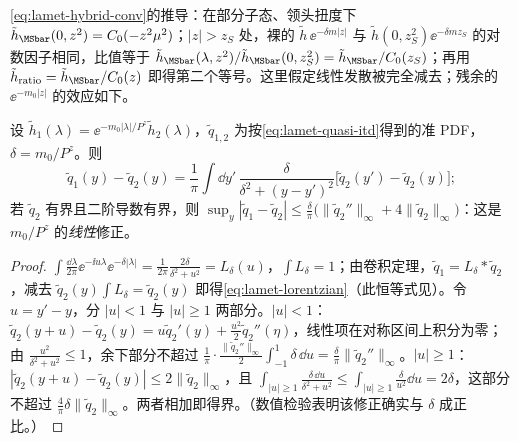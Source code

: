 \cref{eq:lamet-hybrid-conv}的推导：在部分子态、领头扭度下 $\tilde h_{\MSbar}(0,z^2)=C_0(-z^2\mu^2)$；$|z|>z_S$ 处，裸的 $\tilde h\,\ee^{-\delta m|z|}$ 与 $\tilde h(0,z_S^2)\ee^{-\delta mz_S}$ 的对数因子相同，比值等于 $\tilde h_{\MSbar}(\lambda,z^2)/\tilde h_{\MSbar}(0,z_S^2)=\tilde h_{\MSbar}/C_0(z_S)$；再用 $\tilde h_{\rm ratio}=\tilde h_{\MSbar}/C_0(z)$ 即得第二个等号。这里假定线性发散被完全减去；残余的 $\ee^{-m_0|z|}$ 的效应如下。

\begin{lemma}\label{lem:lamet-lorentzian}
设 $\tilde h_1(\lambda)=\ee^{-m_0|\lambda|/P^z}\tilde h_2(\lambda)$，$\tilde q_{1,2}$ 为按\cref{eq:lamet-quasi-itd}得到的准 PDF，$\delta=m_0/P^z$。则
\begin{equation}\label{eq:lamet-lorentzian}
\tilde q_1(y)-\tilde q_2(y)=\frac1\pi\int\dd y'\,\frac{\delta}{\delta^2+(y-y')^2}\big[\tilde q_2(y')-\tilde q_2(y)\big];
\end{equation}
若 $\tilde q_2$ 有界且二阶导数有界，则 $\sup_y|\tilde q_1-\tilde q_2|\le\frac\delta\pi\big(\|\tilde q_2''\|_\infty+4\|\tilde q_2\|_\infty\big)$：这是 $m_0/P^z$ 的\emph{线性}修正。
\end{lemma}

\begin{proof}
$\int\frac{\dd\lambda}{2\pi}\ee^{-\ii u\lambda}\ee^{-\delta|\lambda|}=\frac1{2\pi}\frac{2\delta}{\delta^2+u^2}=L_\delta(u)$，$\int L_\delta=1$；由卷积定理，$\tilde q_1=L_\delta*\tilde q_2$，减去 $\tilde q_2(y)\int L_\delta=\tilde q_2(y)$ 即得\cref{eq:lamet-lorentzian}（此恒等式见\cite{Ji:2020brr}）。令 $u=y'-y$，分 $|u|<1$ 与 $|u|\ge1$ 两部分。$|u|<1$：$\tilde q_2(y+u)-\tilde q_2(y)=u\tilde q_2'(y)+\frac{u^2}2\tilde q_2''(\eta)$，线性项在对称区间上积分为零；由 $\frac{u^2}{\delta^2+u^2}\le1$，余下部分不超过 $\frac1\pi\cdot\frac{\|\tilde q_2''\|_\infty}2\int_{-1}^1\delta\,\dd u=\frac\delta\pi\|\tilde q_2''\|_\infty$。$|u|\ge1$：$|\tilde q_2(y+u)-\tilde q_2(y)|\le2\|\tilde q_2\|_\infty$，且 $\int_{|u|\ge1}\frac{\delta\,\dd u}{\delta^2+u^2}\le\int_{|u|\ge1}\frac{\delta}{u^2}\dd u=2\delta$，这部分不超过 $\frac4\pi\delta\|\tilde q_2\|_\infty$。两者相加即得界。（数值检验表明该修正确实与 $\delta$ 成正比。）
\end{proof}

